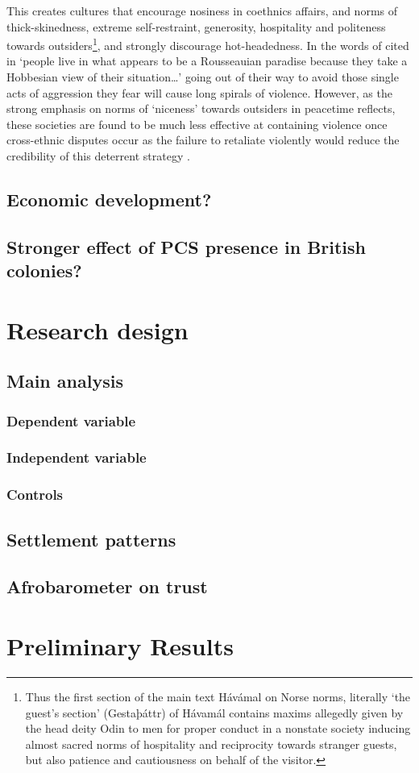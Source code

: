 \documentclass[12pt]{article}
\begin{document}
This creates cultures that encourage nosiness in coethnics affairs, and norms of
thick-skinedness, extreme self-restraint, generosity, hospitality and politeness
towards outsiders\footnote{Thus the first section of the main text Hávámal on
	Norse norms, literally ‘the guest’s section’ (Gestaþáttr) of Hávamál
	contains maxims allegedly given by the head deity Odin to men for proper
	conduct in a nonstate society inducing almost sacred norms of
	hospitality and reciprocity towards stranger guests, but also patience
	and cautiousness on behalf of the visitor.}, and strongly discourage
hot-headedness. In the words of \citet[37]{Colson1974} cited in
\citep[199]{Cohen2004} ‘people live in what appears to be a Rousseauian
paradise because they take a Hobbesian view of their situation…’ going out of
their way to avoid those single acts of aggression they fear will cause long
spirals of violence. However, as the strong emphasis on norms of ‘niceness’
towards outsiders in peacetime reflects, these societies are found to be much
less effective at containing violence once cross-ethnic disputes occur as the
failure to retaliate violently would reduce the credibility of this deterrent
strategy \citep[723f]{Fearon_1996}.

\subsection{Economic development?}

\subsection{Stronger effect of PCS presence in British colonies?}


\section{Research design}
\subsection{Main analysis}

\subsubsection{Dependent variable}
\subsubsection{Independent variable}
\subsubsection{Controls}

\subsection{Settlement patterns}

\subsection{Afrobarometer on trust}

\section{Preliminary Results}




\end{document}
